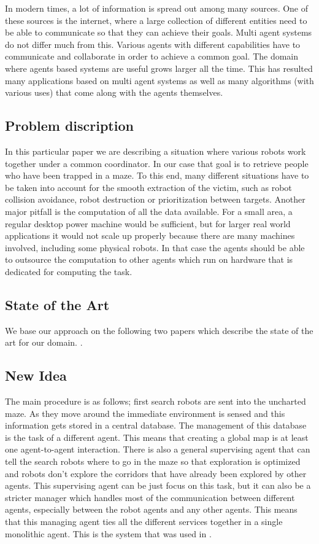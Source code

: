 In modern times, a lot of information is spread out among many sources. One of
these sources is the internet, where a large collection of different entities
need to be able to communicate so that they can achieve their goals. Multi
agent systems do not differ much from this. Various agents with different
capabilities have to communicate and collaborate in order to achieve a common
goal. The domain where agents based systems are useful grows larger all the
time. This has resulted many applications based on multi agent systems as well
as many algorithms (with various uses) that come along with the agents
themselves. 

\subsection{Problem discription}
In this particular paper we are describing a situation where various robots
work together under a common coordinator. In our case that goal is to retrieve
people who have been trapped in a maze. To this end, many different situations
have to be taken into account for the smooth extraction of the victim, such as
robot collision avoidance, robot destruction or prioritization between targets.
Another major pitfall is the computation of all the data available. For a small
area, a regular desktop power machine would be sufficient, but for larger real
world applications it would not scale up properly because there are many
machines involved, including some physical robots. In that case the agents
should be able to outsource the computation to other agents which run on
hardware that is dedicated for computing the task.


\subsection{State of the Art}
We base our approach on the following two papers which describe the state of
the art for our domain. \cite{intframe}.

\subsection{New Idea}
The main procedure is as follows; first search robots are sent into the
uncharted maze. As they move around the immediate environment is sensed and
this information gets stored in a central database. The management of this
database is the task of a different agent. This means that creating a global
map is at least one agent-to-agent interaction. There is also a general
supervising agent that can tell the search robots where to go in the maze so
that exploration is optimized and robots don't explore the corridors that have
already been explored by other agents. This supervising agent can be just focus
on this task, but it can also be a stricter manager which handles most of the
communication between different agents, especially between the robot agents and
any other agents. This means that this managing agent ties all the different
services together in a single monolithic agent. This is the system that was
used in \cite{intframe}.

